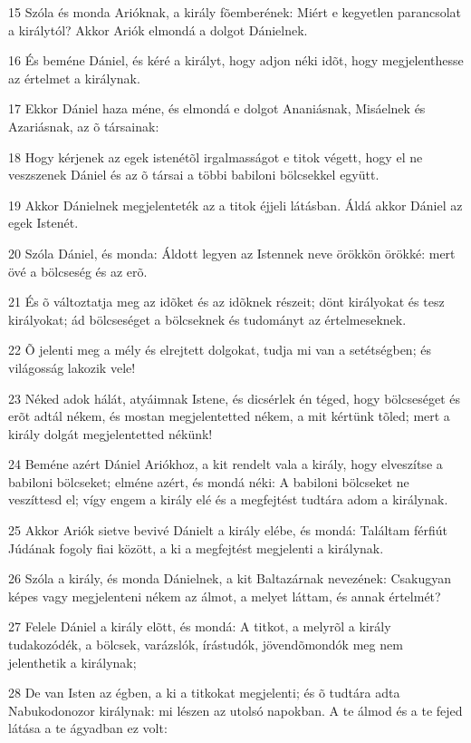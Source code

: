 \par 15 Szóla és monda Arióknak, a király fõemberének: Miért e kegyetlen parancsolat a királytól? Akkor Ariók elmondá a dolgot Dánielnek.
\par 16 És beméne Dániel, és kéré a királyt, hogy adjon néki idõt, hogy megjelenthesse az értelmet a királynak.
\par 17 Ekkor Dániel haza méne, és elmondá e dolgot Ananiásnak, Misáelnek és Azariásnak, az õ társainak:
\par 18 Hogy kérjenek az egek istenétõl irgalmasságot e titok végett, hogy el ne veszszenek Dániel és az õ társai a többi babiloni bölcsekkel együtt.
\par 19 Akkor Dánielnek megjelenteték az a titok éjjeli látásban. Áldá akkor Dániel az egek Istenét.
\par 20 Szóla Dániel, és monda: Áldott legyen az Istennek neve örökkön örökké: mert övé a bölcseség és az erõ.
\par 21 És õ változtatja meg az idõket és az idõknek részeit; dönt királyokat és tesz királyokat; ád bölcseséget a bölcseknek és tudományt az értelmeseknek.
\par 22 Õ jelenti meg a mély és elrejtett dolgokat, tudja mi van a setétségben; és világosság lakozik vele!
\par 23 Néked adok hálát, atyáimnak Istene, és dicsérlek én téged, hogy bölcseséget és erõt adtál nékem, és mostan megjelentetted nékem, a mit kértünk tõled; mert a király dolgát megjelentetted nékünk!
\par 24 Beméne azért Dániel Ariókhoz, a kit rendelt vala a király, hogy elveszítse a babiloni bölcseket; elméne azért, és mondá néki: A babiloni bölcseket ne veszíttesd el; vígy engem a király elé és a megfejtést tudtára adom a királynak.
\par 25 Akkor Ariók sietve bevivé Dánielt a király elébe, és mondá: Találtam férfiút Júdának fogoly fiai között, a ki a megfejtést megjelenti a királynak.
\par 26 Szóla a király, és monda Dánielnek, a kit Baltazárnak nevezének: Csakugyan képes vagy megjelenteni nékem az álmot, a melyet láttam, és annak értelmét?
\par 27 Felele Dániel a király elõtt, és mondá: A titkot, a melyrõl a király tudakozódék, a bölcsek, varázslók, írástudók, jövendõmondók meg nem jelenthetik a királynak;
\par 28 De van Isten az égben, a ki a titkokat megjelenti; és õ tudtára adta Nabukodonozor királynak: mi lészen az utolsó napokban. A te álmod és a te fejed látása a te ágyadban ez volt:
